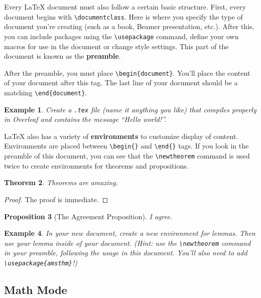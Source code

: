 \documentclass{article}
\newtheorem{theorem}{Theorem} %
\newtheorem{prop}[theorem]{Proposition} %
\newtheorem{example}[theorem]{Example}
\begin{document}
Every \LaTeX{} document must also follow a certain basic structure.
First, every document begins with \texttt{\textbackslash documentclass}.
Here is where you specify the type of document you're creating (such as a book, Beamer presentation, etc.).
After this, you can include packages using the \texttt{\textbackslash usepackage} command, define your own macros for use in the document or change style settings.
This part of the document is known as the \textbf{preamble}.

After the preamble, you must place \texttt{\textbackslash begin\{document\}}.
You'll place the content of your document after this tag.
The last line of your document should be a matching \texttt{\textbackslash end\{document\}}.

\begin{example}
    Create a \texttt{.tex} file (name it anything you like) that compiles properly in Overleaf and contains the message ``Hello world!''.
\end{example}

\LaTeX{} also has a variety of \textbf{environments} to customize display of content.
Environments are placed between \texttt{\textbackslash begin\{\}} and \texttt{\textbackslash end\{\}} tags.
If you look in the preamble of this document, you can see that the \texttt{\textbackslash newtheorem} command is used twice to create environments for theorems and propositions.

\begin{theorem}
    Theorems are amazing.
\end{theorem}
\begin{proof}
    The proof is immediate.
\end{proof}

\begin{prop}[The Agreement Proposition]
    I agree.
\end{prop}

\begin{example}
    In your new document, create a new environment for lemmas.
    Then use your lemma inside of your document.
    (\textit{Hint}: use the \texttt{\textbackslash newtheorem} command in your preamble, following the usage in this document.
    You'll also need to add \texttt{\textbackslash usepackage\{amsthm\}}!)
\end{example}

\subsection{Math Mode}
\end{document}
